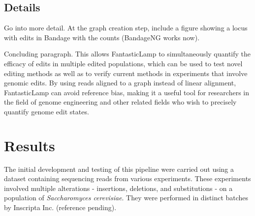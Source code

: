 \documentclass{bioinfo}
\theoremstyle{definition}
\begin{document}
\subsection{Details}
Go into more detail. At the graph creation step, include a figure showing a locus with edits in Bandage with the counts (BandageNG works now).

Concluding paragraph.
This allows FantasticLamp to simultaneously quantify the efficacy of edits in multiple edited populations, which can be used to test novel editing methods as well as to verify current methods in experiments that involve genomic edits.
By using reads aligned to a graph instead of linear alignment, FantasticLamp can avoid reference bias, making it a useful tool for researchers in the field of genome engineering and other related fields who wish to precisely quantify genome edit states.\\




\section{Results}
\label{sec:results}

The initial development and testing of this pipeline were carried out using a dataset containing sequencing reads from various experiments. These experiments involved multiple alterations - insertions, deletions, and substitutions - on a population of \textit{Saccharomyces cerevisiae}. They were performed in distinct batches by Inscripta Inc. (reference pending).
\end{document}
